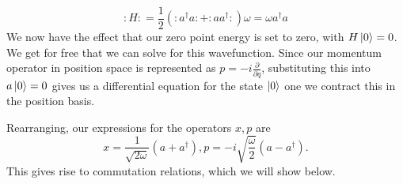 \[ 	
:H: = \frac{ 1}{ 2} ( : a^\dagger a : + : a a^\dagger: )  \omega  = \omega a^\dagger a 
\]
We now have the effect that our zero point energy is set to zero, with $H\ket{ 0 }  =0 $. We get for free that we can solve for this wavefunction. Since our momentum operator in position space is represented as $p = - i \frac{ \partial}{ \partial q } $, substituting this into $a \ket{0}  = 0$ gives us a differential equation for the state $\ket{0}$ one we contract this in the position basis. 

Rearranging, our expressions for the operators $x, p$ are 
\[ 
x = \frac{1}{\sqrt{2 \omega}} \left( a + a^\dagger \right), p = - i \sqrt{\frac{\omega}{2}} \left( a - a^\dagger \right). 
\] 
This gives rise to commutation relations, which we will show below. 

